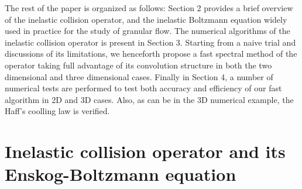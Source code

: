 \documentclass[review, times]{elsarticle}
\begin{document}

The rest of the paper is organized as follows: Section 2 provides a brief overview of the inelastic collision operator, and the inelastic Boltzmann equation widely used in practice for the study of granular flow. The numerical algorithms of the inelastic collision operator is present in Section 3. Starting from a naive trial and discussions of its limitations, we henceforth propose a fast spectral method of the operator taking full advantage of its convolution structure in both the two dimensional and three dimensional cases. Finally in Section 4, a number of numerical tests are performed to test both accuracy and efficiency of our fast algorithm in 2D and 3D cases. Also, as can be in the 3D numerical example, the Haff's coolling law is verified.

\section{Inelastic collision operator and its Enskog-Boltzmann equation}
\end{document}
